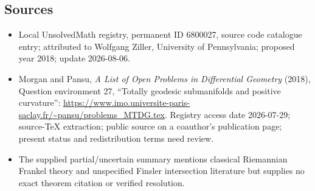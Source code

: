 \documentclass[11pt]{article}
\begin{document}
\subsection{Sources}
\begin{itemize}
\item Local UnsolvedMath registry, permanent ID 6800027, source code catalogue entry; attributed to Wolfgang Ziller, University of Pennsylvania; proposed year 2018; update 2026-08-06.
\item Morgan and Pansu, \emph{A List of Open Problems in Differential Geometry} (2018), Question environment 27, ``Totally geodesic submanifolds and positive curvature'': \url{https://www.imo.universite-paris-saclay.fr/~pansu/problems_MTDG.tex}. Registry access date 2026-07-29; source-TeX extraction; public source on a coauthor's publication page; present status and redistribution terms need review.
\item The supplied partial/uncertain summary mentions classical Riemannian Frankel theory and unspecified Finsler intersection literature but supplies no exact theorem citation or verified resolution.
\end{itemize}
\end{document}
